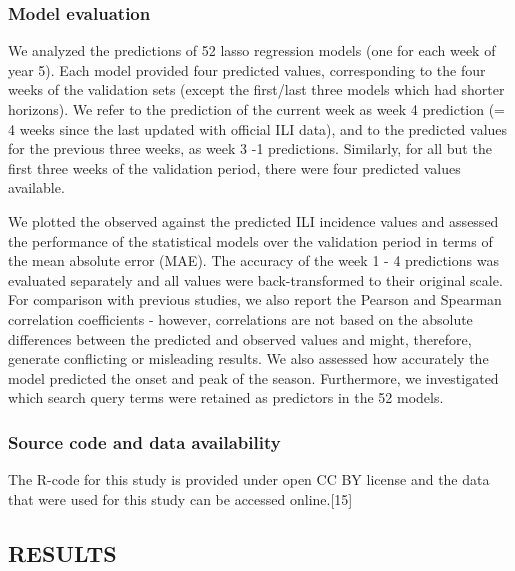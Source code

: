 \documentclass[]{article}
\begin{document}
\hypertarget{model-evaluation}{%
\subsubsection{\texorpdfstring{\textbf{Model
evaluation}}{Model evaluation}}\label{model-evaluation}}

We analyzed the predictions of 52 lasso regression models (one for each
week of year 5). Each model provided four predicted values,
corresponding to the four weeks of the validation sets (except the
first/last three models which had shorter horizons). We refer to the
prediction of the current week as week 4 prediction (= 4 weeks since the
last updated with official ILI data), and to the predicted values for
the previous three weeks, as week 3 -1 predictions. Similarly, for all
but the first three weeks of the validation period, there were four
predicted values available.

We plotted the observed against the predicted ILI incidence values and
assessed the performance of the statistical models over the validation
period in terms of the mean absolute error (MAE). The accuracy of the
week 1 - 4 predictions was evaluated separately and all values were
back-transformed to their original scale. For comparison with previous
studies, we also report the Pearson and Spearman correlation
coefficients - however, correlations are not based on the absolute
differences between the predicted and observed values and might,
therefore, generate conflicting or misleading results. We also assessed
how accurately the model predicted the onset and peak of the season.
Furthermore, we investigated which search query terms were retained as
predictors in the 52 models.

\hypertarget{source-code-and-data-availability}{%
\subsubsection{\texorpdfstring{\textbf{Source code and data
availability}}{Source code and data availability}}\label{source-code-and-data-availability}}

The R-code for this study is provided under open CC BY license and the
data that were used for this study can be accessed online.{[}15{]}

\hypertarget{results}{%
\subsection{\texorpdfstring{\textbf{RESULTS}}{RESULTS}}\label{results}}
\end{document}
